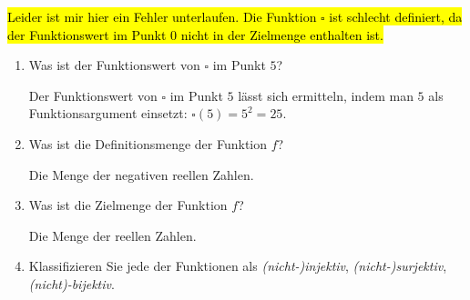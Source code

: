\documentclass[12pt]{article}
\begin{document}
\noindent\hl{Leider ist mir hier ein Fehler unterlaufen. Die Funktion $\square$ ist schlecht definiert, da der Funktionswert im Punkt $0$ nicht in der Zielmenge enthalten ist.}

\begin{enumerate}[label=\alph*)]
\item Was ist der Funktionswert von $\square$ im Punkt $5$?\\
\begin{solution} Der Funktionswert von $\square$ im Punkt $5$ lässt sich ermitteln, indem man $5$ als Funktionsargument einsetzt: $\square(5) = 5^2 = 25$.
\end{solution}
\item Was ist die Definitionsmenge der Funktion $f$?\\
\begin{solution}
Die Menge der negativen reellen Zahlen.
\end{solution}
\item Was ist die Zielmenge der Funktion $f$?\\
\begin{solution}
Die Menge der reellen Zahlen.
\end{solution}
\item Klassifizieren Sie jede der Funktionen als \emph{(nicht-)injektiv}, \emph{(nicht-)surjektiv}, \emph{(nicht)-bijektiv}.\\


\end{enumerate}
\end{document}
